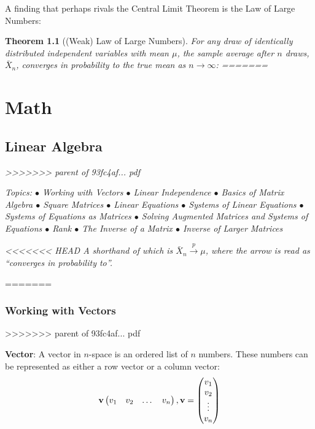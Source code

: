 \documentclass[]{book}
\newtheorem{theorem}{Theorem}[chapter]
\theoremstyle{definition}
\theoremstyle{definition}
\theoremstyle{definition}
\theoremstyle{remark}
\begin{document}
A finding that perhaps rivals the Central Limit Theorem is the Law of Large Numbers:

\begin{theorem}[(Weak) Law of Large Numbers]
\protect\hypertarget{thm:lln-lim}{}{\label{thm:lln-lim} {} }For any draw of identically distributed independent variables with mean \(\mu\), the sample average after \(n\) draws, \(\bar{X}_n\), converges in probability to the true mean as \(n \rightarrow \infty\):
=======
\hypertarget{part-math}{%
\part{Math}\label{part-math}}

\hypertarget{linearalgebra}{%
\chapter{Linear Algebra}\label{linearalgebra}}
>>>>>>> parent of 93fc4af... pdf

Topics:
\(\bullet\) Working with Vectors
\(\bullet\) Linear Independence
\(\bullet\) Basics of Matrix Algebra
\(\bullet\) Square Matrices
\(\bullet\) Linear Equations
\(\bullet\) Systems of Linear Equations
\(\bullet\) Systems of Equations as Matrices
\(\bullet\) Solving Augmented Matrices and Systems of Equations
\(\bullet\) Rank
\(\bullet\) The Inverse of a Matrix
\(\bullet\) Inverse of Larger Matrices

<<<<<<< HEAD
A shorthand of which is \(\bar{X}_n \xrightarrow{p} \mu\), where the arrow is read as ``converges in probability to''.
\end{theorem}
=======
\hypertarget{vector-def}{%
\section{Working with Vectors}\label{vector-def}}
>>>>>>> parent of 93fc4af... pdf

\textbf{Vector}: A vector in \(n\)-space is an ordered list of \(n\) numbers. These numbers can be represented as either a row vector or a column vector:
\[ {\bf v} \begin{pmatrix} v_1 & v_2 & \dots & v_n\end{pmatrix} , {\bf v} = \begin{pmatrix} v_1 \\ v_2 \\ \vdots \\ v_n \end{pmatrix}\]
\end{document}
